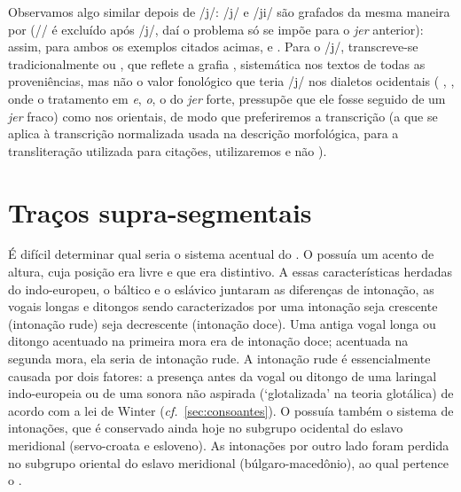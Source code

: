 Observamos algo similar depois de /j/: /j\jeri{}/ e /ji/ são grafados da mesma
maneira por  (/\jeru{}/ é excluído após /j/, daí o problema só se
impõe para o \emph{jer} anterior): assim, para ambos os exemplos citados acimas,
  e 
.
Para o /j\jeri{}/, transcreve-se tradicionalmente  ou ,
que reflete a grafia , sistemática nos textos de todas as
proveniências, mas não o valor fonológico que teria /j\jeri{}/ nos dialetos
ocidentais ( , 
, onde o tratamento em \emph{e}, \emph{o}, o do
\emph{jer} forte, pressupõe que ele fosse seguido de um \emph{jer} fraco) como
nos orientais, de modo que preferiremos a transcrição  (a que se
aplica à transcrição normalizada usada na descrição morfológica, para a
transliteração utilizada para citações, utilizaremos  e não
).


\section{Traços supra-segmentais}

É difícil determinar qual seria o sistema acentual do .
O  possuía um acento de altura, cuja posição era livre e que era
distintivo.
A essas características herdadas do indo-europeu, o báltico e o eslávico
juntaram as diferenças de intonação, as vogais longas e ditongos sendo
caracterizados por uma intonação seja crescente (intonação rude) seja
decrescente (intonação doce).
Uma antiga vogal longa ou ditongo acentuado na primeira mora era de intonação
doce; acentuada na segunda mora, ela seria de intonação rude.
A intonação rude é essencialmente causada por dois fatores: a presença antes da
vogal ou ditongo de uma laringal indo-europeia ou de uma sonora não aspirada
(`glotalizada' na teoria glotálica) de acordo com a lei de Winter
(\emph{cf.}~\ref{sec:consoantes}).
O  possuía também o sistema de intonações, que é conservado ainda
hoje no subgrupo ocidental do eslavo meridional (servo-croata e esloveno).
As intonações por outro lado foram perdida no subgrupo oriental do eslavo
meridional (búlgaro-macedônio), ao qual pertence o .

